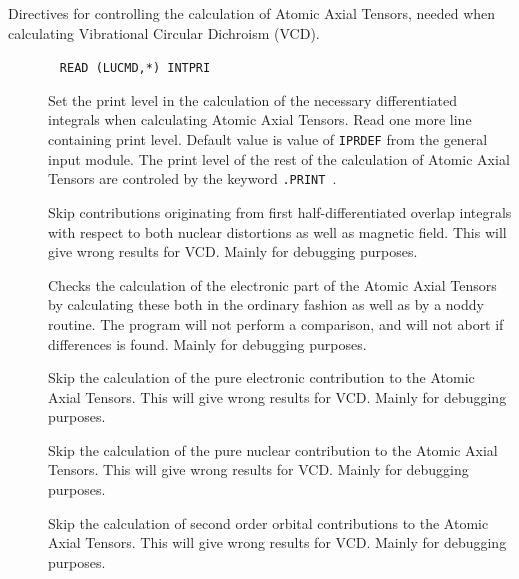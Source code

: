 Directives for controlling the calculation of Atomic Axial
Tensors,
needed when calculating Vibrational Circular Dichroism
(VCD).
\begin{description}

\item[]\verb| |\newline
\verb|READ (LUCMD,*) INTPRI| 

Set the print level in the calculation of the necessary differentiated
integrals when calculating Atomic Axial Tensors. Read one more line
containing print level. Default value is value of \verb|IPRDEF|
from the general input module. The print level of the rest of the
calculation of Atomic Axial Tensors are controled by the keyword
\verb|.PRINT |.

\item[] Skip contributions originating from first
half-differentiated overlap
integrals with respect to both nuclear 
distortions as well as magnetic field. This will give wrong results
for VCD. Mainly for debugging purposes.

\item[] Checks the calculation of the electronic part of
the Atomic Axial Tensors by calculating these both in the ordinary
fashion as well as by a noddy routine. The program will not
perform a comparison, and will not abort if differences is found.
Mainly for debugging purposes.

\item[] Skip the calculation of the pure electronic
contribution to the Atomic Axial Tensors. This will give wrong results
for VCD. Mainly for debugging purposes.

\item[] Skip the calculation of the pure nuclear
contribution to the Atomic Axial Tensors. This will give wrong results
for VCD. Mainly for debugging purposes.

\item[] Skip the calculation of second order orbital
contributions to the Atomic Axial Tensors. This will give wrong
results for VCD. Mainly for debugging purposes.


\end{description}
